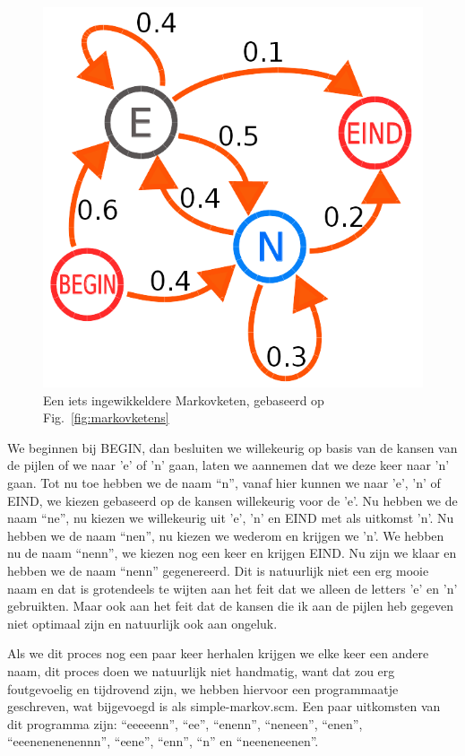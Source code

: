 \documentclass{article}
\begin{document}
\begin{figure}
  \includegraphics[width=0.9\linewidth]{markovketens2.png} 
  \caption{Een iets ingewikkeldere Markovketen, gebaseerd op Fig.~\ref{fig:markovketens}\cite{markovketen2}}
  \label{fig:markovketens2}
\end{figure}

We beginnen bij BEGIN, dan besluiten we willekeurig op basis van de kansen van de pijlen of we naar 'e' of 'n' gaan, laten we aannemen dat we deze keer naar 'n' gaan. Tot nu toe hebben we de naam “n”, vanaf hier kunnen we naar 'e', 'n' of EIND, we kiezen gebaseerd op de kansen willekeurig voor de 'e'. Nu hebben we de naam “ne”, nu kiezen we willekeurig uit 'e', 'n' en EIND met als uitkomst 'n'. Nu hebben we de naam “nen”, nu kiezen we wederom en krijgen we 'n'. We hebben nu de naam “nenn”, we kiezen nog een keer en krijgen EIND. Nu zijn we klaar en hebben we de naam “nenn” gegenereerd. Dit is natuurlijk niet een erg mooie naam en dat is grotendeels te wijten aan het feit dat we alleen de letters 'e' en 'n' gebruikten. Maar ook aan het feit dat de kansen die ik aan de pijlen heb gegeven niet optimaal zijn en natuurlijk ook aan ongeluk.

Als we dit proces nog een paar keer herhalen krijgen we elke keer een andere naam, dit proces doen we natuurlijk niet handmatig, want dat zou erg foutgevoelig en tijdrovend zijn, we hebben hiervoor een programmaatje geschreven, wat bijgevoegd is als simple-markov.scm. Een paar uitkomsten van dit programma zijn: “eeeeenn”, “ee”, “enenn”, “neneen”, “enen”, “eeenenenenennn”, “eene”, “enn”, “n” en “neeneneenen”.
\end{document}
